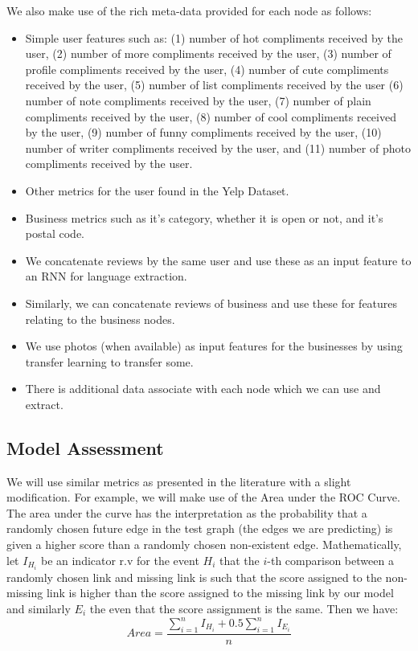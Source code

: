 \documentclass[letterpaper, 11 pt, conference]{ieeeconf}  %
\begin{document}
We also make use of the rich meta-data provided for each node as follows:
\begin{itemize}
\item Simple user features such as: (1) number of hot compliments received by the user, (2) number of more compliments received by the user, (3) number of profile compliments received by the user, (4) number of cute compliments received by the user, (5) number of list compliments received by the user (6) number of note compliments received by the user, (7) number of plain compliments received by the user, (8) number of cool compliments received by the user, (9) number of funny compliments received by the user, (10) number of writer compliments received by the user, and (11) number of photo compliments received by the user.
\item Other metrics for the user found in the Yelp Dataset.
\item Business metrics such as it's category, whether it is open or not, and it's postal code.
\item We concatenate reviews by the same user and use these as an input feature to an RNN for language extraction.
\item Similarly, we can concatenate reviews of business and use these for features relating to the business nodes.
\item We use photos (when available) as input features for the businesses by using transfer learning to transfer some.
\item There is additional data associate with each node which we can use and extract.
\end{itemize}

\subsection{Model Assessment}

We will use similar metrics as presented in the literature with a slight modification. For example, we will make use of the Area under the ROC Curve. The area under the curve has the interpretation as the probability that a randomly chosen future edge in the test graph (the edges we are predicting) is given a higher score than a randomly chosen non-existent edge. Mathematically, let $I_{H_i}$ be an indicator r.v for the event $H_i$ that the $i$-th comparison between a randomly chosen link and missing link is such that the score assigned to the non-missing link is higher than the score assigned to the missing link by our model and similarly $E_i$ the even that the score assignment is the same. Then we have:
$$
Area = \frac{\sum_{i=1}^n I_{H_i} + 0.5 \sum_{i=1}^n I_{E_i}}{n}
$$
\end{document}
